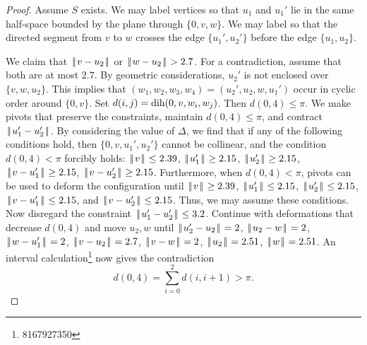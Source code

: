 \documentclass[11pt]{amsart}
\def\op#1{{\text{#1}}}
\def\dih{\op{dih}}
\def\text{\hbox}
\def\|{{\hskip0.1em|\hskip-0.15em|\hskip0.1em}}
\begin{document}
\begin{proof}
Assume $S$ exists.  We may label vertices so that $u_1$ and $u_1'$ lie in the same half-space bounded by
the plane through $\{0,v,w\}$.   We may label so that the directed
segment from $v$ to $w$ crosses the edge $\{u_1',u_2'\}$
before the edge $\{u_1,u_2\}$.

We claim that $\|v-u_2\|$ or $\|w-u_2\| > 2.7$.  For a contradiction, assume that both
are at most $2.7$.  By geometric considerations, $u_2'$ is not enclosed over $\{v,w,u_2\}$.
This implies that $(w_1,w_2,w_3,w_4)=(u_2',u_2,w,u_1')$ occur in cyclic order around $\{0,v\}$.
Set $d(i,j) = \op{dih}(0,v,w_i,w_j)$.  Then $d(0,4)\le \pi$.
We make pivots that preserve the constraints, maintain $d(0,4)\le \pi$, and contract $\|u_1'-u_2'\|$.
By considering the value of $\Delta$, we find that if any of the following conditions hold, then $\{0,v,u_1',u_2'\}$ cannot be collinear, and the condition
$d(0,4)<\pi$ forcibly holds: $\|v\|\le 2.39$, $\|u_1'\|\ge 2.15$, $\|u_2'\|\ge 2.15$, $\|v-u_1'\|\ge 2.15$, $\|v-u_2'\|\ge 2.15$.
Furthermore, when $d(0,4)<\pi$, pivots can be used to deform the configuration until
$\|v\|\ge 2.39$, $\|u_1'\|\le 2.15$, $\|u_2'\|\le 2.15$, $\|v-u_1'\|\le 2.15$, and $\|v-u_2'\|\le 2.15$.  Thus, 
we may assume these conditions.  Now disregard the constraint $\|u_1'-u_2'\|\le 3.2$.  Continue with deformations
that decrease $d(0,4)$ and move $u_2,w$ until $\|u_2'-u_2\|=2$, $\|u_2-w\|=2$, $\|w-u_1'\|=2$, $\|v-u_2\|=2.7$, $\|v-w\|=2$, $\|u_2\|=2.51$, $\|w\|=2.51$.
An interval calculation\footnote{8167927350} now gives the contradiction
  $$d(0,4) = \sum_{i=0}^2d(i,i+1) > \pi.$$
%


\end{proof}
\end{document}
